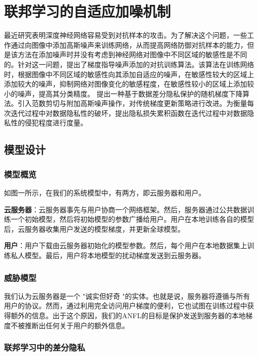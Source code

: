 \chapter{联邦学习的自适应加噪机制}
\label{ch3}

最近研究表明深度神经网络容易受到对抗样本的攻击。为了解决这个问题，一些工作通过向图像中添加高斯噪声来训练网络，从而提高网络防御对抗样本的能力，但是该方法在添加噪声时并没有考虑到神经网络对图像中不同区域的敏感性是不同的。针对这一问题，提出了梯度指导噪声添加的对抗训练算法。该算法在训练网络时，根据图像中不同区域的敏感性向其添加自适应的噪声，在敏感性较大的区域上添加较大的噪声，抑制网络对图像变化的敏感程度，在敏感性较小的区域上添加较小的噪声，提高其分类精度。
提出一种基于数据差分隐私保护的随机梯度下降算法。引入范数剪切与附加高斯噪声操作，对传统梯度更新策略进行改进。为衡量每次迭代过程中对数据隐私性的破坏，提出隐私损失累积函数在迭代过程中对数据隐私性的侵犯程度进行度量。

\section{模型设计}

\subsection{模型概览}
如图一所示，在我们的系统模型中，有两方，即云服务器和用户。

\textbf{云服务器}：云服务器事先与用户协商一个网络框架。然后，服务器通过公共数据训练一个初始模型，然后将初始模型的参数广播给用户。用户在本地训练各自的模型后，云服务器收集用户发送的模型梯度，并更新全球模型。

\textbf{用户}：用户下载由云服务器初始化的模型参数。然后，每个用户在本地数据集上训练私人模型。最后，用户将本地模型的扰动梯度发送到云服务器。

\subsection{威胁模型}
我们认为云服务器是一个 "诚实但好奇 "的实体。也就是说，服务器将遵循与所有用户的协议。然而，通过利用完全访问用户梯度的便利，它也试图在训练过程中获得额外的信息。出于这个原因，我们的ANFL的目标是保护发送到服务器的本地梯度不被推断出任何关于用户的额外信息。


\subsection{联邦学习中的差分隐私}

